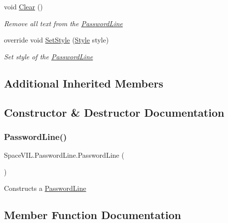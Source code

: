 \begin{DoxyCompactItemize}
void \mbox{\hyperlink{class_space_v_i_l_1_1_password_line_a976403a4d46c253e3568c3642dd56fa1}{Clear}} ()
\begin{DoxyCompactList}\small\item\em Remove all text from the \mbox{\hyperlink{class_space_v_i_l_1_1_password_line}{Password\+Line}} \end{DoxyCompactList}\item 
override void \mbox{\hyperlink{class_space_v_i_l_1_1_password_line_a96f208561afd0f7e997c79fe85aa4d6d}{Set\+Style}} (\mbox{\hyperlink{class_space_v_i_l_1_1_decorations_1_1_style}{Style}} style)
\begin{DoxyCompactList}\small\item\em Set style of the \mbox{\hyperlink{class_space_v_i_l_1_1_password_line}{Password\+Line}} \end{DoxyCompactList}\end{DoxyCompactItemize}
\subsection*{Additional Inherited Members}


\subsection{Constructor \& Destructor Documentation}
\mbox{\label{class_space_v_i_l_1_1_password_line_a3630df351295bbb158675c718a4071be}} 
\subsubsection{\texorpdfstring{Password\+Line()}{PasswordLine()}}
{\footnotesize\ttfamily Space\+V\+I\+L.\+Password\+Line.\+Password\+Line (\begin{DoxyParamCaption}{ }\end{DoxyParamCaption})}



Constructs a \mbox{\hyperlink{class_space_v_i_l_1_1_password_line}{Password\+Line}} 



\subsection{Member Function Documentation}
\mbox{\label{class_space_v_i_l_1_1_password_line_a976403a4d46c253e3568c3642dd56fa1}} 
